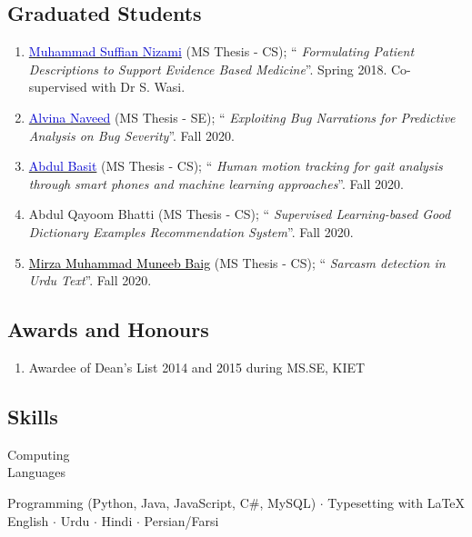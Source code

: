 \documentclass[a4paper, 10pt]{article}
\begin{document}
\subsection*{\textcolor{NavyBlue}{Graduated Students}}
\begin{enumerate}
\itemsep-4pt
\item \href{https://www.linkedin.com/in/msuffian/}{\textcolor{MediumBlue}{Muhammad Suffian Nizami}} (MS Thesis - CS); ``\emph{ Formulating Patient Descriptions to Support Evidence Based Medicine}''. Spring 2018. Co-supervised with Dr S. Wasi.

\item \href{https://www.linkedin.com/in/alvina-naveed-7832a0117/}{\textcolor{MediumBlue}{Alvina Naveed}} (MS Thesis - SE); ``\emph{ Exploiting Bug Narrations for Predictive Analysis on Bug Severity}''. Fall 2020.

\item \href{https://www.linkedin.com/in/abdul-basit-a151b0b9/}{\textcolor{MediumBlue}{Abdul Basit}} (MS Thesis - CS); ``\emph{ Human motion tracking for gait analysis through smart phones and machine learning approaches}''. Fall 2020.

\item Abdul Qayoom Bhatti (MS Thesis - CS); ``\emph{ Supervised Learning-based Good Dictionary Examples Recommendation System}''. Fall 2020.

\item \href{}{\textcolor{black}{Mirza Muhammad Muneeb Baig}} (MS Thesis - CS); ``\emph{ Sarcasm detection in Urdu Text}''. Fall 2020.
\end{enumerate}


\subsection*{\textcolor{NavyBlue}{Awards and Honours}}
\begin{enumerate}
\itemsep-4pt
\item Awardee of Dean's List 2014 and 2015 during MS.SE, KIET
\end{enumerate}


\subsection*{\textcolor{NavyBlue}{Skills}}
\hfill\begin{minipage}{0.17\textwidth}
Computing\textcolor{lightgray}{\dotfill}\\
Languages\textcolor{lightgray}{\dotfill}
\end{minipage}%
\begin{minipage}{0.8\textwidth}
Programming (Python, Java, JavaScript, C\#, MySQL) $\cdot$ Typesetting with \LaTeX\\
English $\cdot$ Urdu $\cdot$ Hindi $\cdot$ Persian/Farsi
\end{minipage}
\end{document}
